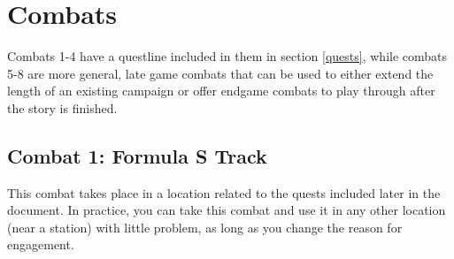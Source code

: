 \documentclass[a4paper]{article}
\begin{document}

\newpage

\section{Combats} \label{combats}

Combats 1-4 have a questline included in them in section \ref{quests}, while combats 5-8 are more general, late game combats that can be used to either extend the length of an existing campaign or offer endgame combats to play through after the story is finished.

\subsection{Combat 1: Formula S Track} \label{combat_1}

This combat takes place in a location related to the quests included later in the document. In practice, you can take this combat and use it in any other location (near a station) with little problem, as long as you change the reason for engagement.
\end{document}
